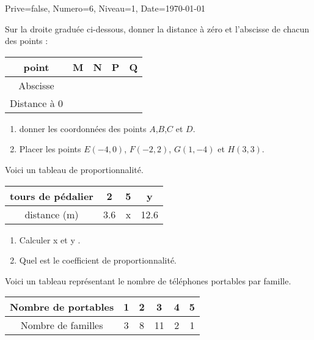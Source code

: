 \documentclass[a4paper,12pt]{article}
\begin{document}
\begin{Maquette}[DM]{Prive=false, Numero=6, Niveau=1, Date=\today}


\begin{exercice}
Sur la droite graduée ci-dessous, donner la distance à zéro et l’abscisse de chacun des points   :


\begin{tabular}{|c|c|c|c|c|}
\hline 
point & M & N & P & Q \\ 
\hline 
Abscisse &  &  &  &  \\ 
\hline 
Distance à 0 &  &  &  &  \\ 
\hline 
\end{tabular} 
\begin{enumerate}
\item donner les coordonnées des points $A$,$B$,$C$ et $D$.
\item Placer les points $E(-4, 0)$, $F(-2, 2)$, $G(1, -4)$ et $H(3, 3)$.
\end{enumerate}
\begin{AffRepere}
\end{AffRepere}
\end{exercice}

\begin{exercice}
Voici un tableau de proportionnalité.
\begin{tabular}{|c|c|c|c|}
\hline 
tours de pédalier & 2 & 5 & y \\ 
\hline 
distance (m) & 3.6 & x & 12.6 \\ 
\hline 
\end{tabular} 
\begin{enumerate}
\item Calculer x et y .
\item Quel est le coefficient de proportionnalité.
\end{enumerate}
\end{exercice}

\begin{exercice}
Voici un tableau représentant le nombre de téléphones portables par famille.

\begin{tabular}{|c|c|c|c|c|c|}
\hline 
Nombre de portables & 1 & 2 & 3 & 4 & 5 \\ 
\hline 
Nombre de familles & 3 & 8 & 11 & 2 & 1 \\ 
\hline 
\end{tabular} 


\end{exercice}
\end{Maquette}
\end{document}
